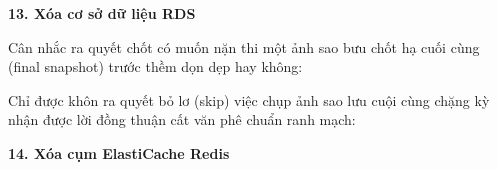 \begin{Shaded}
\begin{Highlighting}[]
\DataTypeTok{\textbackslash{}}
  \DataTypeTok{\textbackslash{}}
\end{Highlighting}
\end{Shaded}

\vspace{0.5em}\noindent\textbf{13. Xóa cơ sở dữ liệu
RDS}\par

Cân nhắc ra quyết chốt có muốn nặn thi một ảnh sao bưu chốt hạ cuối cùng
(final snapshot) trước thềm dọn dẹp hay không:

\begin{Shaded}
\begin{Highlighting}[]
\DataTypeTok{\textbackslash{}}
  \DataTypeTok{\textbackslash{}}
  \OperatorTok{\textless{}}\OperatorTok{\textgreater{}} \DataTypeTok{\textbackslash{}}
\end{Highlighting}
\end{Shaded}

Chỉ được khôn ra quyết bỏ lơ (skip) việc chụp ảnh sao lưu cuội cùng
chặng kỳ nhận được lời đồng thuận cất văn phê chuẩn ranh mạch:

\begin{Shaded}
\begin{Highlighting}[]
\DataTypeTok{\textbackslash{}}
  \DataTypeTok{\textbackslash{}}
   \DataTypeTok{\textbackslash{}}
\end{Highlighting}
\end{Shaded}

\vspace{0.5em}\noindent\textbf{14. Xóa cụm ElastiCache
Redis}\par

\begin{Shaded}
\begin{Highlighting}[]
\DataTypeTok{\textbackslash{}}
  \DataTypeTok{\textbackslash{}}
\end{Highlighting}
\end{Shaded}

